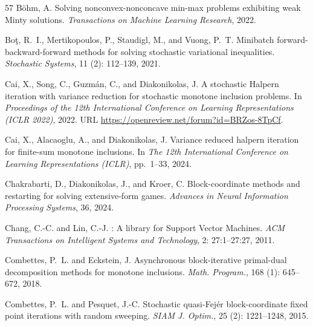 \documentclass{article}
\theoremstyle{plain}
\theoremstyle{definition}
\theoremstyle{remark}
\begin{document}
\begin{thebibliography}{57}
B{\"o}hm, A.
\newblock Solving nonconvex-nonconcave min-max problems exhibiting weak {M}inty
  solutions.
\newblock \emph{Transactions on Machine Learning Research}, 2022.

Bo{\c{t}}, R.~I., Mertikopoulos, P., Staudigl, M., and Vuong, P.~T.
\newblock Minibatch forward-backward-forward methods for solving stochastic
  variational inequalities.
\newblock \emph{Stochastic Systems}, 11 (2): 112--139, 2021.

Cai, X., Song, C., Guzm\'{a}n, C., and Diakonikolas, J.
\newblock A stochastic {H}alpern iteration with variance reduction for
  stochastic monotone inclusion problems.
\newblock In \emph{Proceedings of the 12th International Conference on Learning
  Representations (ICLR 2022)}, 2022.
\newblock URL \url{https://openreview.net/forum?id=BRZos-8TpCf}.

Cai, X., Alacaoglu, A., and Diakonikolas, J.
\newblock Variance reduced halpern iteration for finite-sum monotone
  inclusions.
\newblock In \emph{The 12th International Conference on Learning
  Representations (ICLR)}, pp.\  1--33, 2024.

Chakrabarti, D., Diakonikolas, J., and Kroer, C.
\newblock Block-coordinate methods and restarting for solving extensive-form
  games.
\newblock \emph{Advances in Neural Information Processing Systems}, 36, 2024.

Chang, C.-C. and Lin, C.-J.
: {A} library for {S}upport {V}ector {M}achines.
\newblock \emph{ACM Transactions on Intelligent Systems and Technology},
  2: 27:1--27:27, 2011.

Combettes, P.~L. and Eckstein, J.
\newblock Asynchronous block-iterative primal-dual decomposition methods for
  monotone inclusions.
\newblock \emph{Math. Program.}, 168 (1): 645--672, 2018.

Combettes, P.~L. and Pesquet, J.-C.
\newblock Stochastic quasi-{F}ej{\'e}r block-coordinate fixed point iterations
  with random sweeping.
\newblock \emph{SIAM J. Optim.}, 25 (2): 1221--1248, 2015.


\end{thebibliography}
\end{document}
